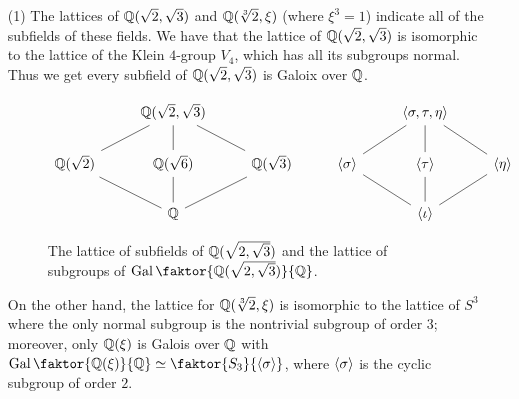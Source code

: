 \begin{example}\label{example_2.4}
    \begin{enumerate}
        \item[(1)] The lattices of $\mathbb{Q}(\sqrt{2},\sqrt{3})$ and $\mathbb{Q}(\sqrt[3]{2},
            \xi)$ (where $\xi^3=1$) indicate all of the subfields of these
            fields. We have that the lattice of $\mathbb{Q}(\sqrt{2},\sqrt{3})$ is
            isomorphic to the lattice of the Klein $4$-group  $V_4$, which has
            all its subgroups normal. Thus we get every subfield of
            $\mathbb{Q}(\sqrt{2},\sqrt{3})$ is Galoix over $\mathbb{Q}$.

            \begin{figure}[h]
                \centering
                \[\begin{tikzcd}
                        & {\Q(\sqrt{2},\sqrt{3})} &&& {\langle \s,
                        \t, \n \rangle} \\ {\Q(\sqrt{2})} & {\Q(\sqrt{6})} &
                        {\Q(\sqrt{3})} & {\langle \s \rangle} &
                        {\langle \t \rangle} & {\langle \n \rangle} \\
                        & {\Q} &&& {\langle \i \rangle}
                        \arrow[no head, from=1-2, to=2-2]
                        \arrow[no head, from=2-2, to=3-2]
                        \arrow[no head, from=3-2, to=2-3]
                        \arrow[no head, from=2-3,to=1-2]
                        \arrow[no head, from=1-2,to=2-1]
                        \arrow[no head,from=2-1, to=3-2]
                        \arrow[no head,from=1-5, to=2-5]
                        \arrow[no head,from=2-5,to=3-5]
                        \arrow[no head,from=3-5,to=2-6]
                        \arrow[no head,from=2-6,to=1-5]
                        \arrow[no head,from=1-5,to=2-4]
                        \arrow[no head,from=2-4,to=3-5]
                \end{tikzcd}\]
                \caption{The lattice of subfields of $\mathbb{Q}(\sqrt{{2},\sqrt{{3}}})$
                and the lattice of subgroups of
            $\Gal{\faktor{\Q(\sqrt{{2},\sqrt{{3}}})}{\Q}}$.}
                \label{figure_2.1}
            \end{figure}

            On the other hand, the lattice for $\mathbb{Q}(\sqrt[3]{2}, \xi)$ is
            isomorphic to the lattice of $S^3$ where the only normal subgroup is
            the nontrivial subgroup of order $3$; moreover, only  $\mathbb{Q}(\xi)$ is
            Galois over $\mathbb{Q}$ with  $\Gal{\faktor{\Q(\xi)}{\Q}} \simeq
            \faktor{S_3}{\langle \s \rangle}$, where $\langle \sigma \rangle$ is the
            cyclic subgroup of order $2$.


\end{enumerate}
\end{example}
